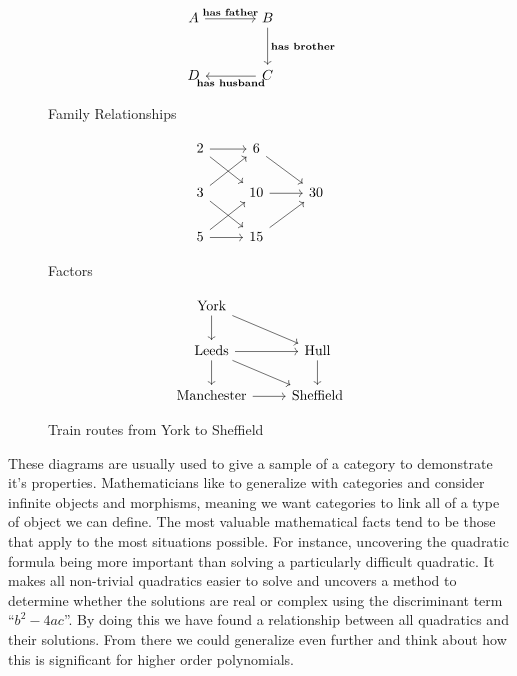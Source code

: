 \documentclass[10pt,a4paper,reqno]{amsart}
\numberwithin{figure}{section}
\begin{document}
\begin{figure}[H]
\centering
        \begin{equation}
        \begin{tikzcd}[sep=large]
                A \ar[r,"\textbf{has father}"] & B \ar[d,"\textbf{has brother}"] \\
                D & C \ar[l,"\textbf{has husband}"]
        \end{tikzcd}
        \end{equation}
\caption{Family Relationships}
\end{figure}
\begin{figure}[H]
\centering
        \begin{equation}
        \begin{tikzcd}
                2 \ar[r] \ar[dr] & 6 \ar[dr]\\
                3 \ar[ur] \ar[dr] & 10 \ar[r] & 30\\
                5 \ar[ur] \ar[r] & 15 \ar[ur]
        \end{tikzcd}
        \end{equation}
\caption{Factors\autocite{Cheng:2022}}
\end{figure}
\begin{figure}[H]
\centering
        \begin{equation}
        \begin{tikzcd}
                \text{York} \ar[d] \ar[dr] \\
                \text{Leeds} \ar[d] \ar[dr] \ar[r] & \text{Hull} \ar[d] \\
                \text{Manchester} \ar[r] & \text{Sheffield}
        \end{tikzcd}
        \end{equation}
\caption{Train routes from York to Sheffield}
\end{figure}

These diagrams are usually used to give a sample of a category to demonstrate
it's properties. Mathematicians like to generalize with categories and consider
infinite objects and morphisms, meaning we want categories to link all of a type
of object we can define. The most valuable mathematical facts tend to be those
that apply to the most situations possible. For instance, uncovering the
quadratic formula being more important than solving a particularly difficult
quadratic. It makes all non-trivial quadratics easier to solve and uncovers a
method to determine whether the solutions are real or complex using the discriminant
term ``$b^2-4ac$''. By doing this we have found a relationship between all
quadratics and their solutions. From there we could generalize even further
and think about how this is significant for higher order polynomials. 
\end{document}
